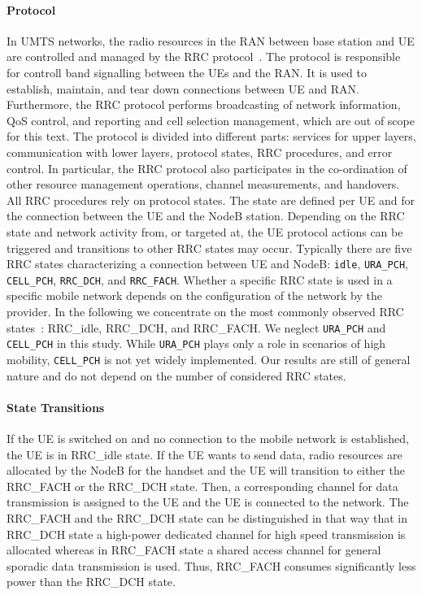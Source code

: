 \paragraph*{ Protocol} In \gls{UMTS} networks, the radio resources in the \gls{RAN} between base station and UE are controlled and managed by the \gls{RRC} protocol~\cite{3GPP_RRC_Spec}.
The protocol is responsible for controll band signalling between the \glspl{UE} and the \gls{RAN}.
It is used to establish, maintain, and tear down connections between \gls{UE} and \gls{RAN}.
Furthermore, the \gls{RRC} protocol performs broadcasting of network information, \gls{QoS} control, and reporting and cell selection management, which are out of scope for this text.
The protocol is divided into different parts: services for upper layers, communication with lower layers, protocol states, \gls{RRC} procedures, and error control.
In particular, the \gls{RRC} protocol also participates in the co-ordination of other resource management operations, channel measurements, and handovers.
All \gls{RRC} procedures rely on protocol states. 
The state are defined per \gls{UE} and for the connection between the \gls{UE} and the \gls{NodeB} station.
Depending on the \gls{RRC} state and network activity from, or targeted at, the \gls{UE} protocol actions can be triggered and transitions to other \gls{RRC} states may occur.
Typically there are five \gls{RRC} states characterizing a connection between \gls{UE} and \gls{NodeB}: \texttt{idle}, \texttt{URA\_PCH}, \texttt{CELL\_PCH}, \texttt{RRC\_DCH}, and \texttt{RRC\_FACH}.
Whether a specific \gls{RRC} state is used in a specific mobile network depends on the configuration of the network by the provider.
In the following we concentrate on the most commonly observed \gls{RRC} states~\cite{Qian2010a}: \gls{RRC_idle}, \gls{RRC_DCH}, and \gls{RRC_FACH}.
We neglect \texttt{URA\_PCH} and \texttt{CELL\_PCH} in this study.
While \texttt{URA\_PCH} plays only a role in scenarios of high mobility, \texttt{CELL\_PCH} is not yet widely implemented. 
Our results are still of general nature and do not depend on the number of considered \gls{RRC} states.

\paragraph*{ State Transitions} If the \gls{UE} is switched on and no connection to the mobile network is established, the \gls{UE} is in \gls{RRC_idle} state.
If the \gls{UE} wants to send data, radio resources are allocated by the \gls{NodeB} for the handset and the \gls{UE} will transition to either the \gls{RRC_FACH} or the \gls{RRC_DCH} state. 
Then, a corresponding channel for data transmission is assigned to the \gls{UE} and the \gls{UE} is connected to the network.
The \gls{RRC_FACH} and the \gls{RRC_DCH} state can be distinguished in that way that in \gls{RRC_DCH} state a high-power dedicated channel for high speed transmission is allocated whereas in \gls{RRC_FACH} state a shared access channel for general sporadic data transmission is used.
Thus, \gls{RRC_FACH} consumes significantly less power than the \gls{RRC_DCH} state. 

